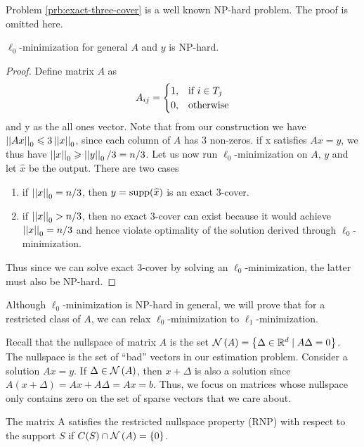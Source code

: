 \documentclass[11pt]{article}
\begin{document}
\begin{remark}
    Problem \ref{prb:exact-three-cover} is a well known NP-hard problem. The proof is omitted here.
\end{remark}

\begin{theorem}
    \(\ell_0\)-minimization for general \(A\) and \(y\) is NP-hard.
\end{theorem}
\begin{proof}
    Define matrix \(A\) as
    \[A_{ij}=\begin{cases}
        1, & \text{if } i \in T_j\\
        0, & \textnormal{otherwise}
    \end{cases}\]
    and y as the all ones vector. Note that from our construction we have \(\left|\left|Ax\right|\right|_0 \leqslant 3\left|\left|x\right|\right|_0\), since each column of \(A\) has 3 non-zeros. if x satisfies \(Ax=y\), we thus have \(\left|\left|x\right|\right|_0 \geqslant \left|\left|y\right|\right|_0/3 = n/3\). Let us now run \(\ell_0\)-minimization on \(A\), \(y\) and let \(\widehat{x}\) be the output. There are two cases
    \begin{enumerate}
        \item if \(\left|\left|x\right|\right|_0 = n/3\), then \(y = \operatorname{supp}(\widehat{x})\) is an exact 3-cover.
        \item if \(\left|\left|x\right|\right|_0 > n/3\), then no exact 3-cover can exist because it would achieve \(\left|\left|x\right|\right|_0 = n/3\) and hence violate optimality of the solution derived through \(\ell_0\)-minimization.
    \end{enumerate}
    Thus since we can solve exact 3-cover by solving an \(\ell_0\)-minimization, the latter must also be NP-hard.
\end{proof}

Although \(\ell_0\)-minimization is NP-hard in general, we will prove that for a restricted class of \(A\), we can relax \(\ell_0\)-minimization to \(\ell_1\)-minimization.

Recall that the nullspace of matrix \(A\) is the set \(\mathcal N\left(A\right)=\left\{\Delta \in\mathbb R^d \mid A \Delta=0\right\}\). The nullspace is the set of ``bad'' vectors in our estimation problem. Consider a solution \(A x=y\). If \(\Delta \in\mathcal N\left(A\right)\), then \(x+\Delta\) is also a solution since \(A(x+\Delta)=A x+A \Delta= A x=b\). Thus, we focus on matrices whose nullspace only contains zero on the set of sparse vectors that we care about.

\begin{definition}
    The matrix A satisfies the restricted nullspace property (RNP) with respect to the support \(S\) if \(C(S) \cap \mathcal N\left(A\right)=\{0\}\).
\end{definition} 
\end{document}
